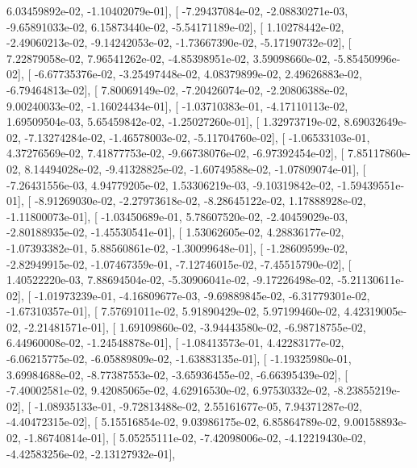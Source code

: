 \documentclass{article}
\begin{document}
          6.03459892e-02,  -1.10402079e-01],
       [ -7.29437084e-02,  -2.08830271e-03,  -9.65891033e-02,
          6.15873440e-02,  -5.54171189e-02],
       [  1.10278442e-02,  -2.49060213e-02,  -9.14242053e-02,
         -1.73667390e-02,  -5.17190732e-02],
       [  7.22879058e-02,   7.96541262e-02,  -4.85398951e-02,
          3.59098660e-02,  -5.85450996e-02],
       [ -6.67735376e-02,  -3.25497448e-02,   4.08379899e-02,
          2.49626883e-02,  -6.79464813e-02],
       [  7.80069149e-02,  -7.20426074e-02,  -2.20806388e-02,
          9.00240033e-02,  -1.16024434e-01],
       [ -1.03710383e-01,  -4.17110113e-02,   1.69509504e-03,
          5.65459842e-02,  -1.25027260e-01],
       [  1.32973719e-02,   8.69032649e-02,  -7.13274284e-02,
         -1.46578003e-02,  -5.11704760e-02],
       [ -1.06533103e-01,   4.37276569e-02,   7.41877753e-02,
         -9.66738076e-02,  -6.97392454e-02],
       [  7.85117860e-02,   8.14494028e-02,  -9.41328825e-02,
         -1.60749588e-02,  -1.07809074e-01],
       [ -7.26431556e-03,   4.94779205e-02,   1.53306219e-03,
         -9.10319842e-02,  -1.59439551e-01],
       [ -8.91269030e-02,  -2.27973618e-02,  -8.28645122e-02,
          1.17888928e-02,  -1.11800073e-01],
       [ -1.03450689e-01,   5.78607520e-02,  -2.40459029e-03,
         -2.80188935e-02,  -1.45530541e-01],
       [  1.53062605e-02,   4.28836177e-02,  -1.07393382e-01,
          5.88560861e-02,  -1.30099648e-01],
       [ -1.28609599e-02,  -2.82949915e-02,  -1.07467359e-01,
         -7.12746015e-02,  -7.45515790e-02],
       [  1.40522220e-03,   7.88694504e-02,  -5.30906041e-02,
         -9.17226498e-02,  -5.21130611e-02],
       [ -1.01973239e-01,  -4.16809677e-03,  -9.69889845e-02,
         -6.31779301e-02,  -1.67310357e-01],
       [  7.57691011e-02,   5.91890429e-02,   5.97199460e-02,
          4.42319005e-02,  -2.21481571e-01],
       [  1.69109860e-02,  -3.94443580e-02,  -6.98718755e-02,
          6.44960008e-02,  -1.24548878e-01],
       [ -1.08413573e-01,   4.42283177e-02,  -6.06215775e-02,
         -6.05889809e-02,  -1.63883135e-01],
       [ -1.19325980e-01,   3.69984688e-02,  -8.77387553e-02,
         -3.65936455e-02,  -6.66395439e-02],
       [ -7.40002581e-02,   9.42085065e-02,   4.62916530e-02,
          6.97530332e-02,  -8.23855219e-02],
       [ -1.08935133e-01,  -9.72813488e-02,   2.55161677e-05,
          7.94371287e-02,  -4.40472315e-02],
       [  5.15516854e-02,   9.03986175e-02,   6.85864789e-02,
          9.00158893e-02,  -1.86740814e-01],
       [  5.05255111e-02,  -7.42098006e-02,  -4.12219430e-02,
         -4.42583256e-02,  -2.13127932e-01],
\end{document}
